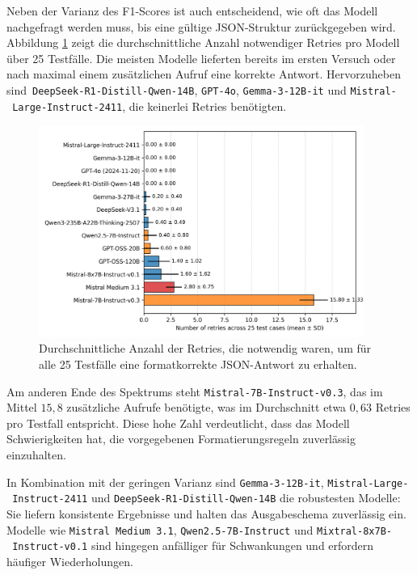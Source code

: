Neben der Varianz des F1-Scores ist auch entscheidend, wie oft das Modell nachgefragt werden muss, bis eine gültige JSON-Struktur zurückgegeben wird. Abbildung \ref{fig:results_evaluation_amount_of_retries} zeigt die durchschnittliche Anzahl notwendiger Retries pro Modell über 25 Testfälle. Die meisten Modelle lieferten bereits im ersten Versuch oder nach maximal einem zusätzlichen Aufruf eine korrekte Antwort. Hervorzuheben sind\linebreak~\texttt{DeepSeek-R1-Distill-Qwen-14B}, \texttt{GPT-4o}, \texttt{Gemma-3-12B-it} und \texttt{Mistral-\linebreak~Large-Instruct-2411}, die keinerlei Retries benötigten.

\begin{figure}[htbp]
    \centering
    \includegraphics[width=0.95\textwidth]{images/results/evaluation_amount_of_retries_en}
    \caption{Durchschnittliche Anzahl der Retries, die notwendig waren, um für alle 25 Testfälle eine formatkorrekte JSON-Antwort zu erhalten.}
    \label{fig:results_evaluation_amount_of_retries}
\end{figure}

Am anderen Ende des Spektrums steht \texttt{Mistral-7B-Instruct-v0.3}, das im Mittel $15{,}8$ zusätzliche Aufrufe benötigte, was im Durchschnitt etwa $0{,}63$ Retries pro Testfall entspricht. Diese hohe Zahl verdeutlicht, dass das Modell Schwierigkeiten hat, die vorgegebenen Formatierungsregeln zuverlässig einzuhalten.

In Kombination mit der geringen Varianz sind \texttt{Gemma-3-12B-it}, \texttt{Mistral-Large-\linebreak~Instruct-2411} und \texttt{DeepSeek-R1-Distill-Qwen-14B} die robustesten Modelle: Sie liefern konsistente Ergebnisse und halten das Ausgabeschema zuverlässig ein. Modelle wie \texttt{Mistral Medium 3.1}, \texttt{Qwen2.5-7B-Instruct} und \texttt{Mixtral-8x7B-\linebreak~Instruct-v0.1} sind hingegen anfälliger für Schwankungen und erfordern häufiger Wiederholungen.